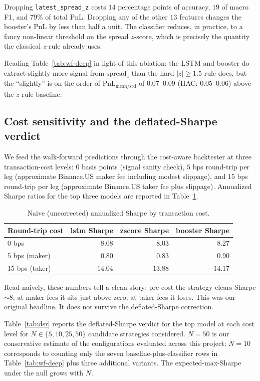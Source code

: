 \documentclass[11pt]{article}
\begin{document}
Dropping \texttt{latest\_spread\_z} costs $14$ percentage points of
accuracy, $19$ of macro F1, and $79\%$ of total PnL. Dropping any of
the other $13$ features changes the booster's PnL by less than half a
unit. The classifier reduces, in practice, to a fancy non-linear
threshold on the spread $z$-score, which is precisely the quantity the
classical $z$-rule already uses.

Reading Table~\ref{tab:wf-deep} in light of this ablation: the LSTM
and booster do extract slightly more signal from
$\text{spread}_z$ than the hard $|z| \geq 1.5$ rule does, but the
``slightly'' is on the order of $\text{PnL}_{\text{mean/std}}$ of
$0.07$--$0.09$ (HAC: $0.05$--$0.06$) above the $z$-rule baseline.

\subsection{Cost sensitivity and the deflated-Sharpe verdict}

We feed the walk-forward predictions through the cost-aware backtester
at three transaction-cost levels: $0$ basis points (signal sanity
check), $5$ bps round-trip per leg (approximate Binance.US maker fee
including modest slippage), and $15$ bps round-trip per leg
(approximate Binance.US taker fee plus slippage). Annualized Sharpe
ratios for the top three models are reported in
Table~\ref{tab:cost-naive}.

\begin{table}[h]
\centering
\caption{Naive (uncorrected) annualized Sharpe by transaction cost.}
\label{tab:cost-naive}
\small
\begin{tabular}{lrrr}
\toprule
Round-trip cost & lstm Sharpe & zscore Sharpe & booster Sharpe \\
\midrule
0 bps           & 8.08  & 8.03  & 8.27 \\
5 bps (maker)   & 0.80  & 0.83  & 0.90 \\
15 bps (taker)  & $-14.04$ & $-13.88$ & $-14.17$ \\
\bottomrule
\end{tabular}
\end{table}

Read naively, these numbers tell a clean story: pre-cost the strategy
clears Sharpe $\sim$8; at maker fees it sits just above zero; at taker
fees it loses. This was our original headline. It does not survive
the deflated-Sharpe correction.

Table~\ref{tab:dsr} reports the deflated-Sharpe verdict for the top
model at each cost level for $N \in \{5, 10, 25, 50\}$ candidate
strategies considered. $N = 50$ is our conservative estimate of the
configurations evaluated across this project; $N = 10$ corresponds to
counting only the seven baseline-plus-classifier rows in
Table~\ref{tab:wf-deep} plus three additional variants. The
expected-max-Sharpe under the null grows with $N$.
\end{document}
